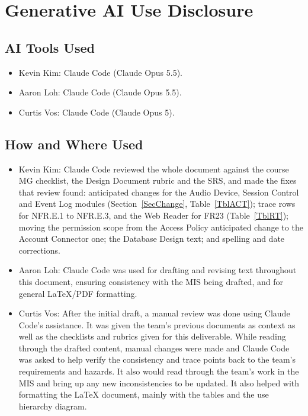 \documentclass[12pt, titlepage]{article}
\begin{document}
\section{Generative AI Use Disclosure}
\subsection{AI Tools Used}
\begin{itemize}
\item Kevin Kim: Claude Code (Claude Opus 5.5).
\item Aaron Loh: Claude Code (Claude Opus 5.5).
\item Curtis Vos: Claude Code (Claude Opus 5).
\end{itemize}

\subsection{How and Where Used}
\begin{itemize}
\item Kevin Kim: Claude Code reviewed the whole document against the course MG checklist,
the Design Document rubric and the SRS, and made the fixes that review found:
anticipated changes for the Audio Device, Session Control and Event Log modules
(Section~\ref{SecChange}, Table~\ref{TblACT}); trace rows for NFR.E.1 to NFR.E.3,
and the Web Reader for FR23 (Table~\ref{TblRT}); moving the permission scope from
the Access Policy anticipated change to the Account Connector one; the Database
Design text; and spelling and date corrections.
\item Aaron Loh: Claude Code was used for drafting and revising text throughout this document, ensuring consistency with the MIS being drafted,
and for general LaTeX/PDF formatting.
\item Curtis Vos: After the initial draft, a manual review was done using Claude Code's assistance. 
It was given the team's previous documents as context as well as the checklists and rubrics given for this deliverable.
While reading through the drafted content, manual changes were made and Claude Code was asked to help verify the consistency
and trace points back to the team's requirements and hazards. It also would read through the team's work in the MIS and bring up
any new inconsistencies to be updated. It also helped with formatting the LaTeX document, mainly with the tables and the use hierarchy diagram.
\end{itemize}
\end{document}
